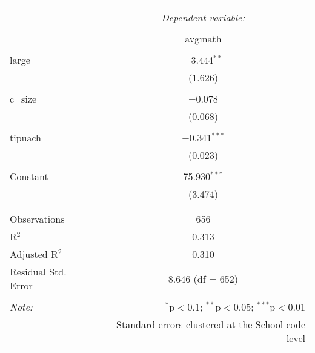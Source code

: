 
\begin{table}[!htbp] \centering 
  \caption{} 
  \label{} 
\begin{tabular}{@{\extracolsep{5pt}}lc} 
\\[-1.8ex]\hline 
\hline \\[-1.8ex] 
 & \multicolumn{1}{c}{\textit{Dependent variable:}} \\ 
\cline{2-2} 
\\[-1.8ex] & avgmath \\ 
\hline \\[-1.8ex] 
 large & $-$3.444$^{**}$ \\ 
  & (1.626) \\ 
  & \\ 
 c\_size & $-$0.078 \\ 
  & (0.068) \\ 
  & \\ 
 tipuach & $-$0.341$^{***}$ \\ 
  & (0.023) \\ 
  & \\ 
 Constant & 75.930$^{***}$ \\ 
  & (3.474) \\ 
  & \\ 
\hline \\[-1.8ex] 
Observations & 656 \\ 
R$^{2}$ & 0.313 \\ 
Adjusted R$^{2}$ & 0.310 \\ 
Residual Std. Error & 8.646 (df = 652) \\ 
\hline 
\hline \\[-1.8ex] 
\textit{Note:}  & \multicolumn{1}{r}{$^{*}$p$<$0.1; $^{**}$p$<$0.05; $^{***}$p$<$0.01} \\ 
 & \multicolumn{1}{r}{Standard errors clustered at the School code level} \\ 
\end{tabular} 
\end{table} 
